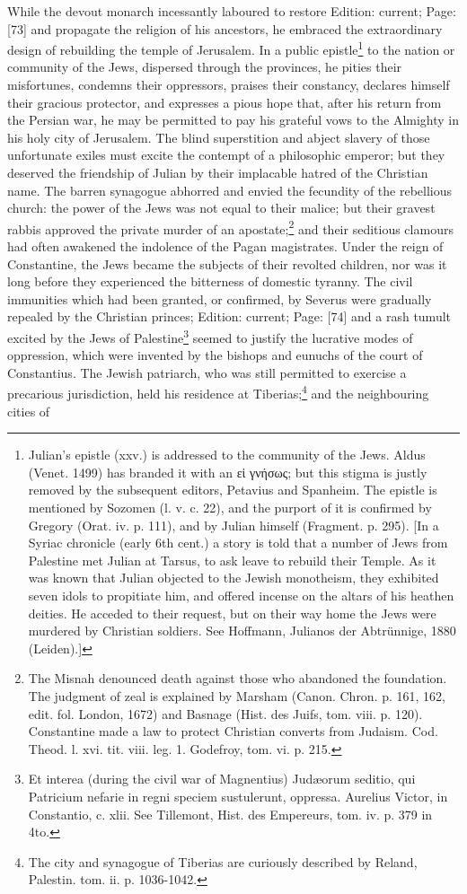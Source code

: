 While the devout monarch incessantly laboured to restore Edition: current; Page: [73] and propagate the religion of his ancestors, he embraced the extraordinary design of rebuilding the temple of Jerusalem. In a public epistle\footnote{Julian\texthebrew{}’s epistle (xxv.) is addressed to the community of the Jews. Aldus (Venet. 1499) has branded it with an \textgreek{ε\texthebrew{ἰ} γνήσως}; but this stigma is justly removed by the subsequent editors, Petavius and Spanheim. The epistle is mentioned by Sozomen (l. v. c. 22), and the purport of it is confirmed by Gregory (Orat. iv. p. 111), and by Julian himself (Fragment. p. 295). [In a Syriac chronicle (early 6th cent.) a story is told that a number of Jews from Palestine met Julian at Tarsus, to ask leave to rebuild their Temple. As it was known that Julian objected to the Jewish monotheism, they exhibited seven idols to propitiate him, and offered incense on the altars of his heathen deities. He acceded to their request, but on their way home the Jews were murdered by Christian soldiers. See Hoffmann, Julianos der Abtrünnige, 1880 (Leiden).]} to the nation or community of the Jews, dispersed through the provinces, he pities their misfortunes, condemns their oppressors, praises their constancy, declares himself their gracious protector, and expresses a pious hope that, after his return from the Persian war, he may be permitted to pay his grateful vows to the Almighty in his holy city of Jerusalem. The blind superstition and abject slavery of those unfortunate exiles must excite the contempt of a philosophic emperor; but they deserved the friendship of Julian by their implacable hatred of the Christian name. The barren synagogue abhorred and envied the fecundity of the rebellious church: the power of the Jews was not equal to their malice; but their gravest rabbis approved the private murder of an apostate;\footnote{The Misnah denounced death against those who abandoned the foundation. The judgment of zeal is explained by Marsham (Canon. Chron. p. 161, 162, edit. fol. London, 1672) and Basnage (Hist. des Juifs, tom. viii. p. 120). Constantine made a law to protect Christian converts from Judaism. Cod. Theod. l. xvi. tit. viii. leg. 1. Godefroy, tom. vi. p. 215.} and their seditious clamours had often awakened the indolence of the Pagan magistrates. Under the reign of Constantine, the Jews became the subjects of their revolted children, nor was it long before they experienced the bitterness of domestic tyranny. The civil immunities which had been granted, or confirmed, by Severus were gradually repealed by the Christian princes; Edition: current; Page: [74] and a rash tumult excited by the Jews of Palestine\footnote{Et interea (during the civil war of Magnentius) Judæorum seditio, qui Patricium nefarie in regni speciem sustulerunt, oppressa. Aurelius Victor, in Constantio, c. xlii. See Tillemont, Hist. des Empereurs, tom. iv. p. 379 in 4to.} seemed to justify the lucrative modes of oppression, which were invented by the bishops and eunuchs of the court of Constantius. The Jewish patriarch, who was still permitted to exercise a precarious jurisdiction, held his residence at Tiberias;\footnote{The city and synagogue of Tiberias are curiously described by Reland, Palestin. tom. ii. p. 1036-1042.} and the neighbouring cities of 